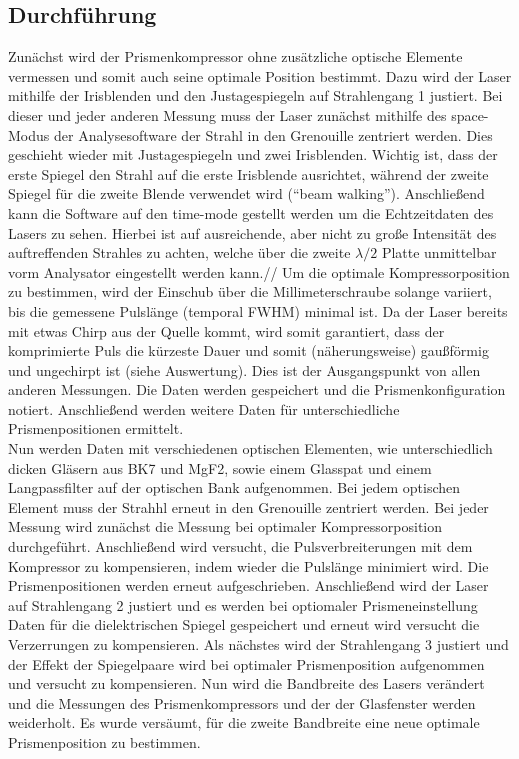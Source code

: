 \documentclass[twoside,        %
               BCOR12mm,       %
               english,ngerman, %
               fleqn,headsepline=false,footsepline=false
              ]{Vorlage/MFPREPORT}
\begin{document}
\subsection{Durchführung}
Zunächst wird der Prismenkompressor ohne zusätzliche optische Elemente
vermessen und somit auch seine optimale Position bestimmt. Dazu wird der Laser mithilfe der Irisblenden und den Justagespiegeln
auf Strahlengang 1 justiert. Bei dieser und jeder anderen Messung muss der
Laser zunächst mithilfe des space-Modus der Analysesoftware der Strahl in den
Grenouille zentriert werden. Dies geschieht wieder mit Justagespiegeln und zwei
Irisblenden. Wichtig ist, dass der erste Spiegel den Strahl auf die erste
Irisblende ausrichtet, während der zweite Spiegel für die zweite Blende
verwendet wird (``beam walking''). Anschließend kann die Software auf den
time-mode gestellt werden um die Echtzeitdaten des Lasers zu sehen. Hierbei ist
auf ausreichende, aber nicht zu große Intensität des auftreffenden Strahles zu
achten, welche über die zweite $\lambda/2$ Platte unmittelbar vorm Analysator
eingestellt werden kann.//
Um die optimale Kompressorposition zu bestimmen, wird der Einschub über die
Millimeterschraube solange variiert, bis die gemessene Pulslänge (temporal
FWHM) minimal ist. Da der Laser bereits mit etwas Chirp aus der Quelle kommt,
wird somit garantiert, dass der komprimierte Puls die kürzeste Dauer und somit
(näherungsweise) gaußförmig und ungechirpt ist (siehe Auswertung). Dies ist der
Ausgangspunkt von allen anderen Messungen. Die Daten
werden gespeichert und die Prismenkonfiguration notiert. Anschließend werden
weitere Daten für unterschiedliche Prismenpositionen ermittelt.\\
Nun werden Daten mit
verschiedenen optischen Elementen, wie unterschiedlich dicken Gläsern aus BK7 und
MgF2, sowie einem Glasspat und einem Langpassfilter auf der optischen Bank
aufgenommen. Bei jedem optischen Element muss der Strahhl erneut in den
Grenouille zentriert werden. Bei jeder Messung wird zunächst die Messung bei
optimaler Kompressorposition durchgeführt. Anschließend wird versucht, die
Pulsverbreiterungen mit dem Kompressor zu kompensieren, indem wieder die
Pulslänge minimiert wird. Die Prismenpositionen werden erneut aufgeschrieben.
Anschließend wird der Laser auf Strahlengang 2 justiert und es werden bei
optiomaler Prismeneinstellung Daten für die dielektrischen Spiegel gespeichert
und erneut wird versucht die Verzerrungen zu kompensieren.
Als nächstes wird der Strahlengang 3 justiert und der Effekt der Spiegelpaare
wird bei optimaler Prismenposition aufgenommen und versucht zu kompensieren.
Nun wird die Bandbreite des Lasers verändert und die Messungen des
Prismenkompressors und der der Glasfenster werden weiderholt.
Es wurde versäumt, für die zweite Bandbreite eine neue optimale Prismenposition
zu bestimmen.
\end{document}
